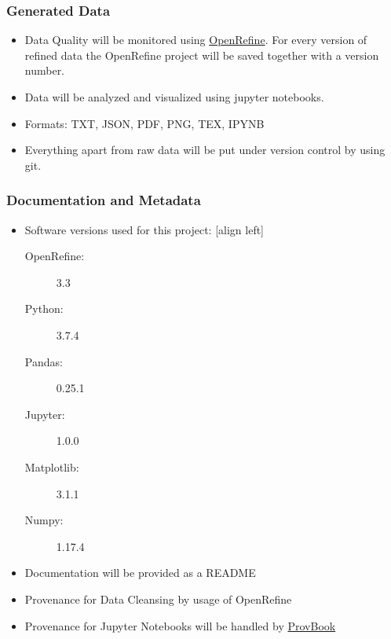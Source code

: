 \documentclass{beamer}
\begin{document}
\begin{frame}
\frametitle{Generated Data}
\begin{itemize}

\item Data Quality will be monitored using \href{https://openrefine.org/}{OpenRefine}. For every version of refined data the OpenRefine project will be saved together with a version number.
\vfill
\item Data will be analyzed and visualized using jupyter notebooks. 
\vfill
\item Formats: TXT, JSON, PDF, PNG, TEX, IPYNB
\vfill
\item Everything apart from raw data will be put under version control by using git.
\end{itemize}
\end{frame}

\begin{frame}
\frametitle{Documentation and Metadata}
\begin{itemize}
\item Software versions used for this project:
[align left]
\begin{description}
\item[OpenRefine:] 3.3
\item[Python: ] 3.7.4
\item[Pandas: ] 0.25.1
\item[Jupyter: ] 1.0.0
\item[Matplotlib: ] 3.1.1
\item[Numpy: ] 1.17.4 
\end{description}
\vfill
\item Documentation will be provided as a README
\vfill
\item Provenance for Data Cleansing by usage of OpenRefine
\vfill
\item Provenance for Jupyter Notebooks will be handled by \href{https://github.com/Sheeba-Samuel/ProvBook}{ProvBook}
\end{itemize}
\end{frame}
\end{document}
